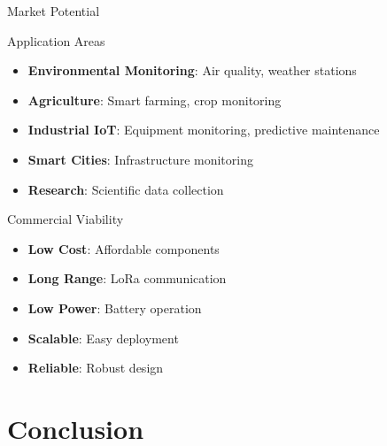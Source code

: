 \documentclass[aspectratio=169]{beamer}
\begin{document}
\begin{frame}{Market Potential}
\begin{block}{Application Areas}
\begin{itemize}
    \item \textbf{Environmental Monitoring}: Air quality, weather stations
    \item \textbf{Agriculture}: Smart farming, crop monitoring
    \item \textbf{Industrial IoT}: Equipment monitoring, predictive maintenance
    \item \textbf{Smart Cities}: Infrastructure monitoring
    \item \textbf{Research}: Scientific data collection
\end{itemize}
\end{block}

\begin{block}{Commercial Viability}
\begin{itemize}
    \item \textbf{Low Cost}: Affordable components
    \item \textbf{Long Range}: LoRa communication
    \item \textbf{Low Power}: Battery operation
    \item \textbf{Scalable}: Easy deployment
    \item \textbf{Reliable}: Robust design
\end{itemize}
\end{block}
\end{frame}

\section{Conclusion}
\end{document}
